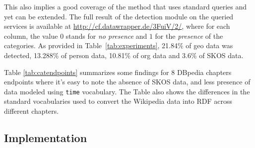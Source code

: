This also implies a good coverage of the method that uses standard queries and yet can be extended. The full result of the detection module on the queried services is available at \url{http://cf.datawrapper.de/3FuiV/2/}, where for each column, the value $0$ stands for \textit{no presence} and $1$ for the \textit{presence} of the categories. As provided in Table~\ref{tab:experiments}, 21.84\% of geo data was detected, 13.288\% of person data, 10.81\% of org data and 3.6\% of SKOS data.
 
\begin{table}[ht!]
\end{table}

Table \ref{tab:catendpoints} summarizes some findings for $8$ DBpedia chapters endpoints where it's easy to note the absence of SKOS data, and less presence of data modeled using \texttt{time} vocabulary. The Table also shows the differences in the standard vocabularies used to convert the Wikipedia data into RDF across different chapters. 


\subsection{Implementation}

